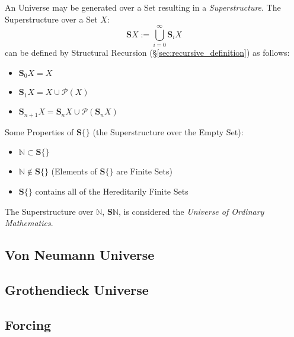 An Universe may be generated over a Set resulting in a
\emph{Superstructure}. The Superstructure over a Set $X$:
\[
  \mathbf{S}X := \bigcup^{\infty}_{i=0}\mathbf{S}_i X
\]
can be defined by Structural Recursion
(\S\ref{sec:recursive_definition}) as follows:
\begin{itemize}

\item $\mathbf{S}_0 X = X$
\item $\mathbf{S}_1 X = X \cup \mathcal{P}(X)$
\item $\mathbf{S}_{n+1} X =
  \mathbf{S}_n X \cup \mathcal{P}(\mathbf{S}_n X)$

\end{itemize}
Some Properties of $\mathbf{S}\{\}$ (the Superstructure over the Empty
Set):
\begin{itemize}

\item $\mathbb{N} \subset \mathbf{S}\{\}$
\item $\mathbb{N} \notin \mathbf{S}\{\}$ (Elements of $\mathbf{S}\{\}$
  are Finite Sets)
\item $\mathbf{S}\{\}$ contains all of the Hereditarily Finite Sets

\end{itemize}

The Superstructure over $\mathbb{N}$, $\mathbf{S}\mathbb{N}$, is
considered the \emph{Universe of Ordinary Mathematics}.



\subsection{Von Neumann Universe}\label{sec:vonneumann_universe}

\subsection{Grothendieck Universe}\label{sec:grothendieck_universe}


\subsection{Forcing}\label{sec:forcing}



